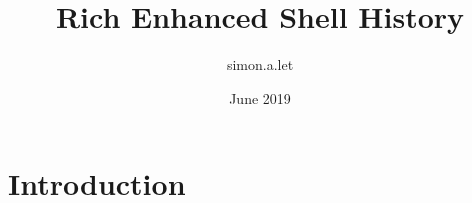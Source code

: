 \documentclass{article}
\title{Rich Enhanced Shell History}
\author{simon.a.let }
\date{June 2019}
\begin{document}
\maketitle

\section{Introduction}
\end{document}
